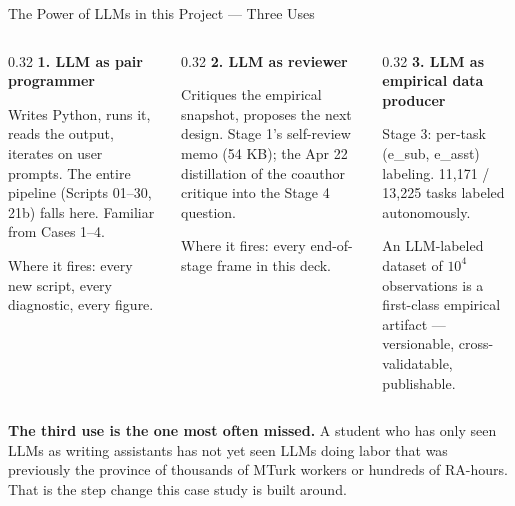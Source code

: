 \documentclass[10pt,english,aspectratio=169]{beamer}
\begin{document}
\begin{frame}{The Power of LLMs in this Project --- Three Uses}
\begin{columns}[T]
\begin{column}{0.32\textwidth}
\textbf{1. LLM as pair programmer}
\begin{tcolorbox}[colback=gray!5,colframe=gray!40]\scriptsize
Writes Python, runs it, reads the output, iterates on user prompts. The entire pipeline (Scripts 01--30, 21b) falls here. Familiar from Cases 1--4.

\vspace{0.1cm}
Where it fires: every new script, every diagnostic, every figure.
\end{tcolorbox}
\end{column}
\begin{column}{0.32\textwidth}
\textbf{2. LLM as reviewer}
\begin{tcolorbox}[colback=gray!5,colframe=gray!40]\scriptsize
Critiques the empirical snapshot, proposes the next design. Stage 1's self-review memo (54 KB); the Apr 22 distillation of the coauthor critique into the Stage 4 question.

\vspace{0.1cm}
Where it fires: every end-of-stage frame in this deck.
\end{tcolorbox}
\end{column}
\begin{column}{0.32\textwidth}
\textbf{3. LLM as empirical data producer}
\begin{tcolorbox}[colback=blue!3,colframe=RedTitle!60]\scriptsize
Stage 3: per-task (e\_sub, e\_asst) labeling. 11,171 / 13,225 tasks labeled autonomously.

\vspace{0.1cm}
An LLM-labeled dataset of $10^4$ observations is a first-class empirical artifact --- versionable, cross-validatable, publishable.
\end{tcolorbox}
\end{column}
\end{columns}

\vspace{0.3cm}
\begin{tcolorbox}[colback=blue!3,colframe=RedTitle!60]\scriptsize
\textbf{The third use is the one most often missed.} A student who has only seen LLMs as writing assistants has not yet seen LLMs doing labor that was previously the province of thousands of MTurk workers or hundreds of RA-hours. That is the step change this case study is built around.
\end{tcolorbox}
\end{frame}
\end{document}
